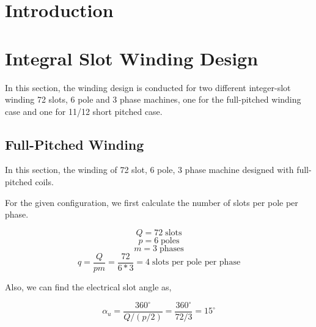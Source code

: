 \documentclass[11pt]{report}
\begin{document}
\maketitle

\tableofcontents
\newpage
\section*{Introduction}


\newpage

\section*{Integral Slot Winding Design}

In this section, the winding design is conducted for two different integer-slot winding 72 slots, 6 pole and 3 phase machines, one for the full-pitched winding case and one for 11/12 short pitched case. 

\subsection*{Full-Pitched Winding}
In this section, the winding of 72 slot, 6 pole, 3 phase machine designed with full-pitched coils.


For the given configuration, we first calculate the number of slots per pole per phase.

\begin{equation}
    Q = 72 \;\text{slots}
\end{equation}
\begin{equation}
    p = 6 \;\text{poles}
\end{equation}
\begin{equation}
    m = 3 \;\text{phases}
\end{equation}
\begin{equation}
    q = \frac{Q}{pm} = \frac{72}{6*3} = 4 \;\text{slots per pole per phase} 
\end{equation}

Also, we can find the electrical slot angle as,

\begin{equation}
    \alpha_u= \frac{360^\circ}{Q/(p/2)}=\frac{360^\circ}{72/3}=15^\circ
\end{equation}
\end{document}
